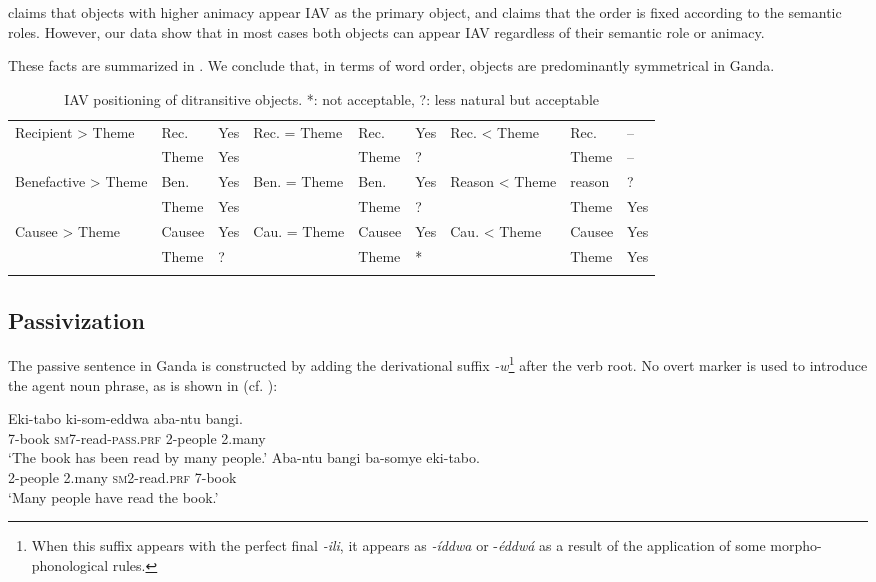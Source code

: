 \documentclass[output=paper,
            colorlinks, citecolor=brown
            ,draftmode
		  ]{langscibook}
\begin{document}
\citet[69]{Ssekiryango2006} claims that objects with higher animacy appear IAV as the primary object, and \citet[599]{Ranero2019} claims that the order is fixed according to the semantic roles.  However, our data show that in most cases both objects can appear IAV regardless of their semantic role or animacy.     

These facts are summarized in . We conclude that, in terms of word order, objects are predominantly symmetrical in Ganda. 

\begin{table}
\small
\begin{tabularx}{\textwidth}{QllQllQll}

\lsptoprule
Recipient > Theme & Rec. & Yes & Rec. = Theme & Rec. & Yes & Rec. < Theme & Rec. & {}--\\
 & Theme & Yes &  & Theme & ? &  & Theme & {}--\\
\tablevspace
Benefactive > Theme & Ben. & Yes & Ben. = Theme & Ben. & Yes & Reason < Theme & reason & ?\\
 & Theme & Yes &  & Theme & ? &  & Theme & Yes\\
\tablevspace
Causee > Theme & Causee & Yes & Cau. = Theme & Causee & Yes & Cau. < Theme & Causee & Yes\\
 & Theme & ? &  & Theme & * &  & Theme & Yes\\
\lspbottomrule
\end{tabularx}
\caption{IAV positioning of ditransitive objects. *: not acceptable,  ?: less natural but acceptable}
\label{tab:yoneda:1}
\end{table}

\subsection{Passivization}\label{sec:yoneda:3.2}



The passive sentence in Ganda is constructed by adding the derivational suffix \textit{{}-w}\footnote{When this suffix appears with the perfect final \textit{{}-ili}, it appears as \textit{{}-íddwa} or -\textit{éddwá} as a result of the application of some morpho-phonological rules.} after the verb root. No overt marker is used to introduce the agent noun phrase, as is shown in  (cf. ):


\ea%
    \label{ex:yoneda:18}
    \ea\label{ex:yoneda:18a}\gll  Eki-tabo    ki-som-eddwa           aba-ntu    bangi.\\
         7-book    \textsc{sm7}-read-\textsc{pass.prf}    2-people    2.many\\
    \glt ‘The book has been read by many people.’
    \ex\label{ex:yoneda:18b} \gll  Aba-ntu   bangi     ba-somye        eki-tabo.\\
    2-people    2.many  \textsc{sm2}-read.\textsc{prf}    7-book\\
    \glt ‘Many people have read the book.’
    \z
\z
        
\end{document}
